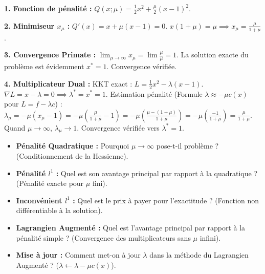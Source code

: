 \begin{correction}
\textbf{1. Fonction de pénalité :}
$Q(x; \mu) = \frac{1}{2}x^2 + \frac{\mu}{2}(x-1)^2$.

\textbf{2. Minimiseur $x_\mu$ :}
$Q'(x) = x + \mu(x-1) = 0$.
$x(1+\mu) = \mu \implies x_\mu = \frac{\mu}{1+\mu}$.

\textbf{3. Convergence Primate :}
$\lim_{\mu \to \infty} x_\mu = \lim \frac{\mu}{\mu} = 1$.
La solution exacte du problème est évidemment $x^*=1$. Convergence vérifiée.

\textbf{4. Multiplicateur Dual :}
KKT exact : $L = \frac{1}{2}x^2 - \lambda(x-1)$. $\nabla L = x - \lambda = 0 \implies \lambda^* = x^* = 1$.
Estimation pénalité (Formule $\lambda \approx -\mu c(x)$ pour $L = f - \lambda c$) :
$\lambda_\mu = -\mu (x_\mu - 1) = -\mu (\frac{\mu}{1+\mu} - 1) = -\mu (\frac{\mu - (1+\mu)}{1+\mu}) = -\mu (\frac{-1}{1+\mu}) = \frac{\mu}{1+\mu}$.
Quand $\mu \to \infty$, $\lambda_\mu \to 1$.
Convergence vérifiée vers $\lambda^* = 1$.
\end{correction}
\bigskip

\bigskip
\begin{checkpoint}
\begin{itemize}
    \item \textbf{Pénalité Quadratique :} Pourquoi $\mu \to \infty$ pose-t-il problème ? (Conditionnement de la Hessienne).
    \item \textbf{Pénalité $l^1$ :} Quel est son avantage principal par rapport à la quadratique ? (Pénalité exacte pour $\mu$ fini).
    \item \textbf{Inconvénient $l^1$ :} Quel est le prix à payer pour l'exactitude ? (Fonction non différentiable à la solution).
    \item \textbf{Lagrangien Augmenté :} Quel est l'avantage principal par rapport à la pénalité simple ? (Convergence des multiplicateurs sans $\mu$ infini).
    \item \textbf{Mise à jour :} Comment met-on à jour $\lambda$ dans la méthode du Lagrangien Augmenté ? ($\lambda \leftarrow \lambda - \mu c(x)$).
\end{itemize}
\end{checkpoint}

